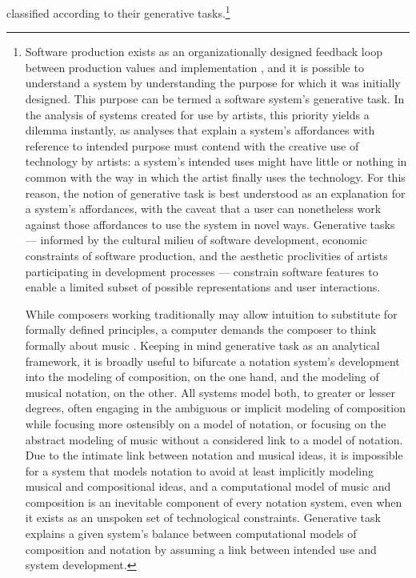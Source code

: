 \documentclass{article}
\begin{document}
classified according to their generative tasks.\footnote{Software production
exists as an organizationally designed feedback loop between production values
and implementation \cite{Derniame:1999fk}, and it is possible to understand a
system by understanding the purpose for which it was initially designed. This
purpose can be termed a software system's generative task. In the analysis of
systems created for use by artists, this priority yields a dilemma instantly,
as analyses that explain a system's affordances with reference to intended
purpose must contend with the creative use of technology by artists: a system's
intended uses might have little or nothing in common with the way in which the
artist finally uses the technology. For this reason, the notion of generative
task is best understood as an explanation for a system's affordances, with the
caveat that a user can nonetheless work against those affordances to use the
system in novel ways. Generative tasks --- informed by the cultural milieu of
software development, economic constraints of software production, and the
aesthetic proclivities of artists participating in development processes ---
constrain software features to enable a limited subset of possible
representations and user interactions.

While composers working traditionally may allow intuition to substitute for
formally defined principles, a computer demands the composer to think formally
about music \cite{Xenakis:1992rq}. Keeping in mind generative task as an
analytical framework, it is broadly useful to bifurcate a  notation
system's development into the modeling of composition, on the one
hand, and the modeling of musical notation, on the other. All systems model
both, to greater or lesser degrees, often engaging in the ambiguous or implicit
modeling of composition while focusing more ostensibly on a model of
notation, or focusing on the abstract modeling of music without a considered
link to a model of notation. Due to the intimate link between notation and
musical ideas, it is impossible for a system that models notation to avoid at
least implicitly modeling musical and compositional ideas, and a computational
model of music and composition is an inevitable component of every
notation system, even when it exists as an unspoken set of technological
constraints. Generative task explains a given system's balance between
computational models of composition and notation by assuming a link
between intended use and system development.}
\end{document}
